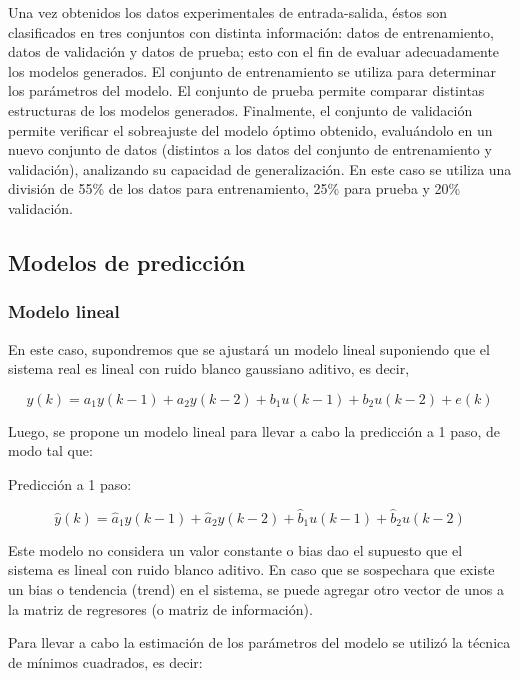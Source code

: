 \documentclass[12pt]{article}
\begin{document}
Una vez obtenidos los datos experimentales de entrada-salida, éstos son clasificados en tres conjuntos con distinta información: datos de entrenamiento, datos
de validación y datos de prueba; esto con el fin de evaluar adecuadamente los modelos
generados. El conjunto de entrenamiento se utiliza para determinar los parámetros del
modelo. El conjunto de prueba permite comparar distintas estructuras de los modelos
generados. Finalmente, el conjunto de validación permite verificar el sobreajuste del
modelo óptimo obtenido, evaluándolo en un nuevo conjunto de datos (distintos a los
datos del conjunto de entrenamiento y validación), analizando su capacidad de
generalización. En este caso se utiliza una división de 55\% de los datos para entrenamiento, 25\% para prueba y 20\% validación.

\subsection{Modelos de predicción}
\subsubsection{Modelo lineal}

En este caso, supondremos que se ajustará un modelo lineal suponiendo que el sistema real es lineal con ruido blanco gaussiano aditivo, es decir,


\begin{equation}
y(k)=a_1 y(k-1)+a_2 y(k-2)+b_1 u(k-1)+b_2 u(k-2)+e(k)
\label{e_ModeloLineal}
\end{equation}

Luego, se propone un modelo lineal para llevar a cabo la predicción a 1 paso, de modo tal que:

Predicción a 1 paso:

\begin{equation}
\hat{y}(k)=\hat{a}_1 y(k-1)+\hat{a}_2 y(k-2)+\hat{b}_1 u(k-1)+\hat{b}_2 u(k-2)
\label{e_Pre1paso}
\end{equation}

Este modelo no considera un valor constante o bias dao el supuesto que el sistema es lineal con ruido blanco aditivo. En caso que se sospechara que existe un bias o tendencia (trend) en el sistema, se puede agregar otro vector de unos a la matriz de regresores (o matriz de información).

Para llevar a cabo la estimación de los parámetros del modelo se utilizó la técnica de mínimos cuadrados, es decir:
\end{document}
